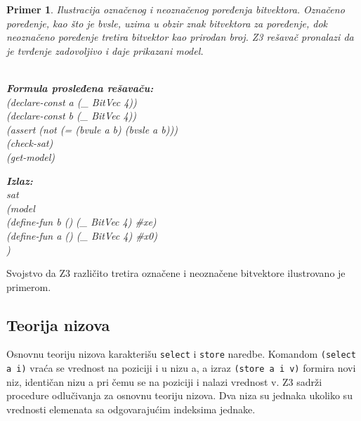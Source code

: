 \documentclass[12pt,oneside]{memoir}
\newcommand\tab[1][0.5cm]{\hspace*{#1}}
\newtheorem{primer}{Primer}
\begin{document}
\begin{primer} Ilustracija označenog i neoznačenog poređenja bitvektora. Označeno poređenje, kao što je bvsle, uzima u obzir znak bitvektora za poređenje, dok neoznačeno poređenje tretira bitvektor kao prirodan broj. Z3 rešavač pronalazi da je tvrđenje zadovoljivo i daje prikazani model.
\\ \\
\begin{minipage}[b]{0.5\textwidth}
\textbf{Formula prosleđena rešavaču:}
\\(declare-const a (\_ BitVec 4))
\\(declare-const b (\_ BitVec 4))
\\(assert (not (= (bvule a b) (bvsle a b)))
\\(check-sat)
\\(get-model)
\end{minipage}
\hspace{1.15cm} 
\begin{minipage}[t]{0.5\textwidth}
\vspace{-3.45cm}
\textbf{Izlaz:}
\\sat 
\\(model 
\\\tab(define-fun b () (\_ BitVec 4) \#xe) 
\\\tab(define-fun a () (\_ BitVec 4) \#x0)
\\)
\end{minipage}


\end{primer}
Svojstvo da Z3 različito tretira označene i neoznačene bitvektore ilustrovano je  primerom.
 

    



\subsection{Teorija nizova} 
Osnovnu teoriju nizova karakterišu \texttt{select} i \texttt{store} naredbe. 
Komandom \texttt{(select a i)} vraća se vrednost na poziciji i u nizu a, a izraz \texttt{(store a i v)} formira novi niz, identičan nizu a pri čemu se na poziciji i nalazi vrednost v.
Z3 sadrži procedure odlučivanja za osnovnu teoriju nizova.
Dva niza su jednaka ukoliko su vrednosti elemenata sa odgovarajućim indeksima jednake.
 
\end{document}
